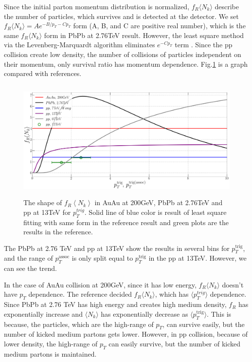 \documentclass[jkps,fleqn,showpacs,showkeys]{revtex4}
\begin{document}
Since the initial parton momentum distribution is normalized, $f_R \langle N_k \rangle$ describe the number of particles, which survives and is detected at the detector. We set $f_R \langle N_k \rangle = Ae^{-{B} / {p_{T}} - Cp_T}$ form (A, B, and C are positive real number),
which is the same $f_R \langle N_k \rangle$ form in PbPb at 2.76TeV result\cite{PbPb}.
However, the least square method via the Levenberg-Marquardt algorithm eliminates $e^{-Cp_T}$ term .
Since the pp collision create low density, the number of collisions of particles independent on their momentum, only survival ratio has momentum dependence.
Fig.\ref{figure:frnk} is a graph compared with references\cite{Wong_1, PbPb, Hanul}.


\begin{figure}[ht]
\centering
\includegraphics[width=12cm, height=6cm]{./Figures/Paper_frnk}
\caption{The shape of $f_R \left\langle N_k \right\rangle$ in AuAu at 200GeV, PbPb at 2.76TeV and pp at 13TeV for $p_{T}^{trig}$.
Solid line of blue color is result of least square fitting with same form in the reference\cite{PbPb} result and green plots are the results in the reference\cite{Hanul}.}
\label{figure:frnk}
\end{figure}

The PbPb at 2.76 TeV and pp at 13TeV show the results in several bins for $p_T^{\text{trig}}$, and the range of $p_T^{\text{assoc}}$ is only split equal to $p_T^{\text{trig}}$ in the pp at 13TeV. However, we can see the trend.


In the case of AuAu collision at 200GeV, since it has low energy, $f_R \langle N_k \rangle$ doesn't have $p_T$ dependence.
The reference\cite{PbPb} decided  $f_R \langle N_k \rangle$, which has $\langle p_T^{trig} \rangle$ dependence. Since PbPb at 2.76 TeV has high energy and creates high medium density, $f_R$ has exponentially increase and $\langle N_k \rangle$ has exponentially decrease as $\langle p_T^{\text{trig}} \rangle$. This is because, the particles, which are the high-range of $p_T$, can survive easily, but the number of kicked medium partons gets lower.
However, in pp collision, because of lower density, the high-range of $p_T$ can easily survive, but the number of kicked medium partons is maintained.
\end{document}
